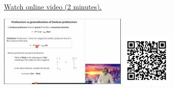
\begin{minipage}{10cm}
    \href{https://act4e-spring21.netlify.app/videos/spring2021-profunctors:profunctors.html}{Watch online video (2 minutes).}
        
    \href{https://act4e-spring21.netlify.app/videos/spring2021-profunctors:profunctors.html}{\includegraphics[height=3.5cm]{spring2021-profunctors:profunctors/thumbnails.jpg}}
    \href{https://act4e-spring21.netlify.app/videos/spring2021-profunctors:profunctors.html}{\includegraphics[height=2.5cm]{spring2021-profunctors:profunctors/qrcode.png}}
\end{minipage}
